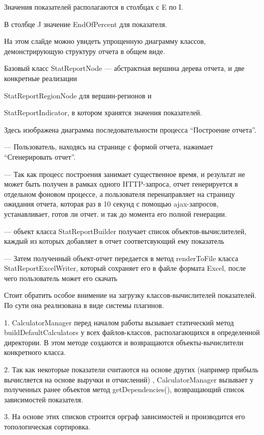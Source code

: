 \documentclass[a4paper]{article}
\begin{document}
Значения показателей располагаются в столбцах с E по I.

В столбце J значение EndOfPercent для показателя.

\newpage

На этом слайде можно увидеть упрощенную диаграмму классов, демонстрирующую структуру отчета в общем виде.

Базовый класс StatReportNode --- абстрактная вершина дерева отчета,
и две конкретные реализации 

StatReportRegionNode для вершин-регионов и

StatReportIndicator, в котором хранятся значения показателей.

\newpage

Здесь изображена диаграмма последовательности процесса “Построение отчета”.

--- Пользователь, находясь на странице с формой отчета, нажимает “Сгенерировать отчет”.

--- Так как процесс построения занимает существенное время, и результат не может быть получен в рамках одного HTTP-запроса, 
отчет генерируется в отдельном фоновом процессе, а пользователя перенаправляет на страницу ожидания отчета, которая раз в 10 секунд с помощью ajax-запросов, устанавливает, готов ли отчет.
и так до момента его полной генерации.

--- объект класса StatReportBuilder получает список объектов-вычислителей, каждый из которых добавляет в отчет соответсвующий ему показатель

--- Затем полученный объект-отчет передается в метод renderToFile класса StatReportExcelWriter, который сохраняет его в файле формата Excel, после чего пользователь может его скачать

\newpage
Стоит обратить особое внимение на загрузку классов-вычислителей показателей. По сути она реализована в виде системы плагинов.

1. CalculatorManager перед началом работы вызывает статический метод buildDefaultCalculators у всех файлов-классов, располагающихся в определенной директории.
В этом методе создаются и возвращаются объекты-вычислители конкретного класса.

2. Так как некоторые показатели считаются на основе других 
(например прибыль вычисляется на основе выручки и отчислений)
, CalculatorManager вызывает у полученных ранее объектов метод getDependencies(), возвращающий список зависимостей показателя.

3. На основе этих списков строится орграф зависимостей и производится его топологическая сортировка.
\end{document}
